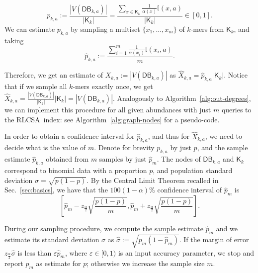 \documentclass[a4paper,11pt]{article}
\newcommand{\DB}{\mathsf{DB}_{k,a}}
\newcommand{\K}{\mathsf{K}}
\newcommand{\abu}{\alpha}
\newcommand{\RLCSA}{{\sf RLCSA}}
\renewcommand{\geq}{\geqslant}
\begin{document}
\[p_{k,a} := \frac{|V(\DB)|}{|\K_k|} = \frac{\sum_{x \in \K_k} \frac{1}{\abu(x)}\mathbb{I}(x,a)}{|\K_k|} \in [0,1].\]
%
%
We can estimate $p_{k,a}$ by sampling a multiset $\{x_1,\dots,x_m\}$ of $k$-mers from $\K_k$, and taking
\[\hat{p}_{k,a} := \frac{\sum_{i = 1}^m \frac{1}{\abu(x_i)}\mathbb{I}(x_i, a)}{m}.\]

Therefore, we get an estimate of $X_{k,a} := |V(\DB)|$ as $\hat{X}_{k,a} = \hat{p}_{k,a}|\K_k|$. Notice that if we sample all $k$-mers exactly once, we get $\hat{X}_{k,a} = \frac{|V(\DB)|}{|\K_k|}|\K_k| = |V(\DB)|$. Analogously to Algorithm~\ref{alg:out-degrees}, we can implement this procedure for all given abundances with just $m$ queries to the \RLCSA~index: see Algorithm~\ref{alg:graph-nodes} for a pseudo-code. 

In order to obtain a confidence interval for $\hat{p}_{k,a}$, and thus for $\hat{X}_{k,a}$, we need to decide what is the value of $m$. Denote for brevity $p_{k,a}$ by just $p$, and the sample estimate $\hat{p}_{k,a}$ obtained from $m$ samples by just $\hat{p}_m$. The nodes of $\DB$ and $\K_k$ correspond to binomial data with a proportion $p$, and population standard deviation $\sigma = \sqrt{p(1-p)}$. By the Central Limit Theorem recalled in Sec.~\ref{sec:basics}, we have that the $100(1-\alpha)\%$ confidence interval of $\hat{p}_m$ is
\[\left[\hat{p}_m - z_{\frac{\alpha}{2}}\sqrt{\frac{p(1-p)}{m}} , \hat{p}_m + z_{\frac{\alpha}{2}}\sqrt{\frac{p(1-p)}{m}}\right]. \]

During our sampling procedure, we compute the sample estimate $\hat{p}_m$ and we estimate its standard deviation $\sigma$ as $\hat{\sigma} := \sqrt{\hat{p}_m(1-\hat{p}_m)}$. If the margin of error $z_{\frac{\alpha}{2}}\hat{\sigma}$ is less than $\varepsilon \hat{p}_m$, where $\varepsilon \in [0,1)$ is an input accuracy parameter, we stop and report $\hat{p}_m$ as estimate for $p$; otherwise we increase the sample size $m$. 

\end{document}
